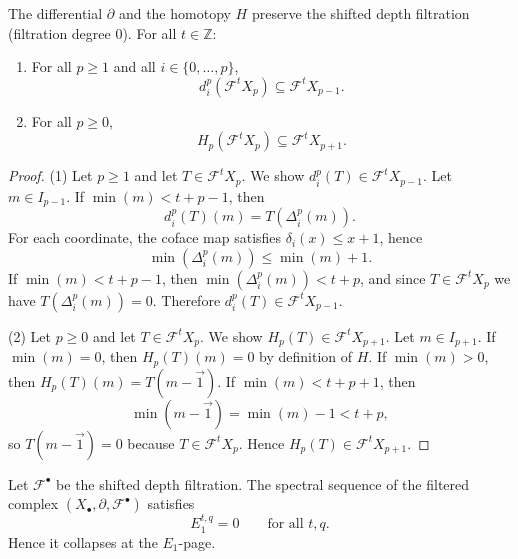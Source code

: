 \begin{lemma}\label{lem:shifted_filtration}
The differential $\partial$ and the homotopy $H$ preserve the shifted depth filtration (filtration degree $0$). For all $t\in\mathbb{Z}$:
\begin{enumerate}
    \item For all $p\ge 1$ and all $i\in\{0,\dots,p\}$,
    \[
    d_i^p(\mathcal{F}^t X_p) \subseteq \mathcal{F}^t X_{p-1}.
    \]
    \item For all $p\ge 0$,
    \[
    H_p(\mathcal{F}^t X_p) \subseteq \mathcal{F}^t X_{p+1}.
    \]
\end{enumerate}
\end{lemma}

\begin{proof}
(1) Let $p\ge 1$ and let $T \in \mathcal{F}^t X_p$. We show $d_i^p(T) \in \mathcal{F}^t X_{p-1}$.
Let $m \in I_{p-1}$. If $\min(m) < t+p-1$, then
\[
d_i^p(T)(m) = T(\Delta_i^p(m)).
\]
For each coordinate, the coface map satisfies $\delta_i(x)\le x+1$, hence
\[
\min(\Delta_i^p(m)) \le \min(m)+1.
\]
If $\min(m) < t+p-1$, then $\min(\Delta_i^p(m)) < t+p$, and since $T\in\mathcal{F}^t X_p$ we have
$T(\Delta_i^p(m))=0$. Therefore $d_i^p(T)\in \mathcal{F}^t X_{p-1}$.

(2) Let $p\ge 0$ and let $T \in \mathcal{F}^t X_p$. We show $H_p(T) \in \mathcal{F}^t X_{p+1}$.
Let $m \in I_{p+1}$. If $\min(m)=0$, then $H_p(T)(m)=0$ by definition of $H$.
If $\min(m)>0$, then $H_p(T)(m)=T(m-\vec{1})$. If $\min(m) < t+p+1$, then
\[
\min(m-\vec{1}) = \min(m)-1 < t+p,
\]
so $T(m-\vec{1})=0$ because $T\in\mathcal{F}^t X_p$. Hence $H_p(T)\in \mathcal{F}^t X_{p+1}$.
\end{proof}


\begin{proposition}\label{prop:E1collapse_shifted}
Let $\mathcal{F}^\bullet$ be the shifted depth filtration. The spectral sequence of the filtered complex $(X_\bullet,\partial,\mathcal{F}^\bullet)$ satisfies
\[
E_1^{t,q}=0\qquad\text{for all }t,q.
\]
Hence it collapses at the $E_1$-page.
\end{proposition}


